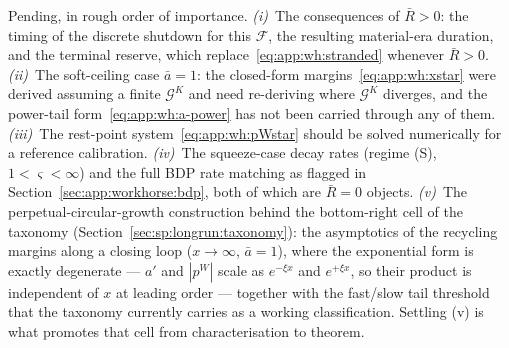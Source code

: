 Pending, in rough order of importance. \emph{(i)}~The consequences of $\bar R>0$: the timing of the discrete shutdown for this $\mathcal F$, the resulting material-era duration, and the terminal reserve, which replace~\eqref{eq:app:wh:stranded} whenever $\bar R>0$. \emph{(ii)}~The soft-ceiling case $\bar a=1$: the closed-form margins~\eqref{eq:app:wh:xstar} were derived assuming a finite $\mathcal G^K$ and need re-deriving where $\mathcal G^K$ diverges, and the power-tail form~\eqref{eq:app:wh:a-power} has not been carried through any of them. \emph{(iii)}~The rest-point system~\eqref{eq:app:wh:pWstar} should be solved numerically for a reference calibration. \emph{(iv)}~The squeeze-case decay rates (regime (S), $1<\varsigma<\infty$) and the full BDP rate matching as flagged in Section~\ref{sec:app:workhorse:bdp}, both of which are $\bar R=0$ objects. \emph{(v)}~The perpetual-circular-growth construction behind the bottom-right cell of the taxonomy (Section~\ref{sec:sp:longrun:taxonomy}): the asymptotics of the recycling margins along a closing loop ($x\to\infty$, $\bar a=1$), where the exponential form is exactly degenerate --- $a'$ and $\left|p^W\right|$ scale as $e^{-\xi x}$ and $e^{+\xi x}$, so their product is independent of $x$ at leading order --- together with the fast/slow tail threshold that the taxonomy currently carries as a working classification. Settling (v) is what promotes that cell from characterisation to theorem.

